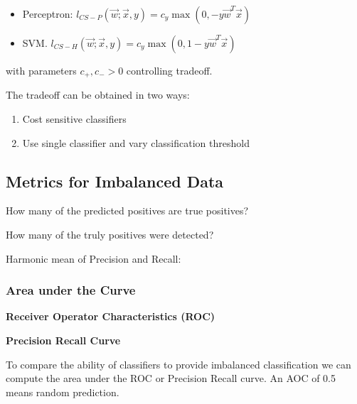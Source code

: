 \documentclass[10pt,a4paper]{scrartcl}
\begin{document}
\begin{multicols*}{2}
\begin{itemize}
\item Perceptron: $l_{CS-P}(\vec{w};\vec{x},y)=c_y \max(0,-y\vec{w}^T\vec{x})$
\item SVM. $l_{CS-H}(\vec{w};\vec{x},y)=c_y\max(0,1-y\vec{w}^T\vec{x})$
\end{itemize}

with parameters $c_+,c_->0$ controlling tradeoff.

The tradeoff can be obtained in two ways:

\begin{enumerate}
\item Cost sensitive classifiers
\item Use single classifier and vary classification threshold

\end{enumerate}

\subsection{Metrics for Imbalanced Data}


How many of the predicted positives are true positives?


How many of the truly positives were detected?



Harmonic mean of Precision and Recall:


\subsubsection{Area under the Curve}

\textbf{Receiver Operator Characteristics (ROC)}


\textbf{Precision Recall Curve}


To compare the ability of classifiers to provide imbalanced classification we can compute the area under the ROC or Precision Recall curve. An AOC of 0.5 means random prediction.


\end{multicols*}
\end{document}

